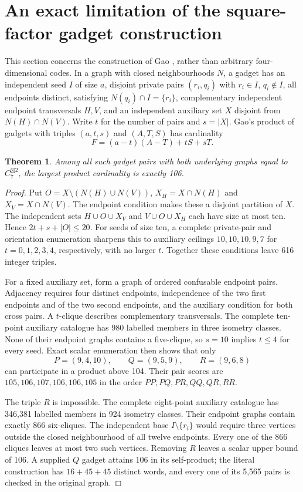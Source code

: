 \documentclass[11pt]{article}
\newtheorem{theorem}{Theorem}[section]
\theoremstyle{definition}
\newcommand{\G}[1]{C_7^{\boxtimes #1}}
\begin{document}
\section{An exact limitation of the square-factor gadget construction}
This section concerns the construction of Gao \cite{gao}, rather than
arbitrary four-dimensional codes. In a graph with closed neighbourhoods
$N$, a gadget has an independent seed $I$ of size $a$, disjoint private
pairs $(r_i,q_i)$ with $r_i\in I$, $q_i\notin I$, all endpoints
distinct, satisfying $N(q_i)\cap I=\{r_i\}$, complementary
independent endpoint transversals $H,V$, and an independent auxiliary
set $X$ disjoint from $N(H)\cap N(V)$. Write $t$ for the number of pairs
and $s=|X|$. Gao's product of gadgets with triples $(a,t,s)$ and
$(A,T,S)$ has cardinality
\[
 F=(a-t)(A-T)+tS+sT.
\]

\begin{theorem}
Among all such gadget pairs with both underlying graphs equal to
$\G2$, the largest product cardinality is exactly 106.
\end{theorem}
\begin{proof}
Put $O=X\setminus(N(H)\cup N(V))$, $X_H=X\cap N(H)$ and
$X_V=X\cap N(V)$. The endpoint condition makes these a disjoint
partition of $X$. The independent sets $H\cup O\cup X_V$ and
$V\cup O\cup X_H$ each have size at most ten. Hence
$2t+s+|O|\leq20$. For seeds of size ten, a complete private-pair and
orientation enumeration sharpens this to auxiliary ceilings
$10,10,10,9,7$ for $t=0,1,2,3,4$, respectively, with no larger $t$.
Together these conditions leave 616 integer triples.

For a fixed auxiliary set, form a graph of ordered confusable endpoint
pairs. Adjacency requires four distinct endpoints, independence of the
two first endpoints and of the two second endpoints, and the auxiliary
condition for both cross pairs. A $t$-clique describes complementary
transversals. The complete ten-point auxiliary catalogue has 980
labelled members in three isometry classes. None of their endpoint
graphs contains a five-clique, so $s=10$ implies $t\leq4$ for every seed.
Exact scalar enumeration then shows that only
\[
 P=(9,4,10),\qquad Q=(9,5,9),\qquad R=(9,6,8)
\]
can participate in a product above 104. Their pair scores are
$105,106,107,106,106,105$ in the order $PP,PQ,PR,QQ,QR,RR$.

The triple $R$ is impossible. The complete eight-point auxiliary
catalogue has 346,381 labelled members in 924 isometry classes.
Their endpoint graphs contain exactly 866 six-cliques. The independent
base $I\setminus\{r_i\}$ would require three vertices outside the
closed neighbourhood of all twelve endpoints. Every one of the 866
cliques leaves at most two such vertices. Removing $R$ leaves a scalar
upper bound of 106. A supplied $Q$ gadget attains 106 in its self-product;
the literal construction has $16+45+45$ distinct words, and every one
of its 5,565 pairs is checked in the original graph.
\end{proof}
\end{document}
